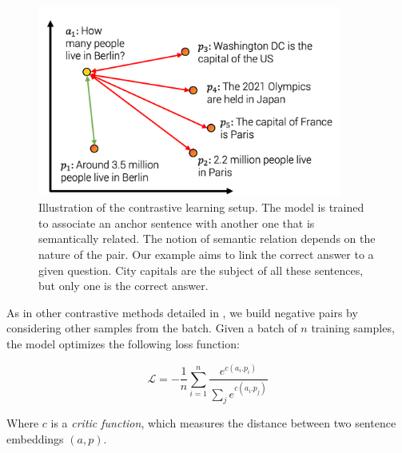 \begin{figure}[htb!]
	\includegraphics[width=10cm]{images/contrastive_1.png}
	\caption[Contrastive learning]{Illustration of the contrastive learning setup. The model is trained to associate an anchor sentence with another one that is semantically related. The notion of semantic relation depends on the nature of the pair. Our example aims to link the correct answer to a given question. City capitals are the subject of all these sentences, but only one is the correct answer.}
\end{figure}

As in other contrastive methods detailed in , we build negative pairs by considering other samples from the batch. Given a batch of $n$ training samples, the model optimizes the following loss function:

\begin{equation}
    \mathcal{L} = -\frac{1}{n}\sum_{i=1}^n\frac{e^{c(a_i. p_i)}}{\sum_j e^{c(a_i. p_j)}}    
\end{equation}

Where $c$ is a \textit{critic function}, which measures the distance between two sentence embeddings $(a, p)$.



